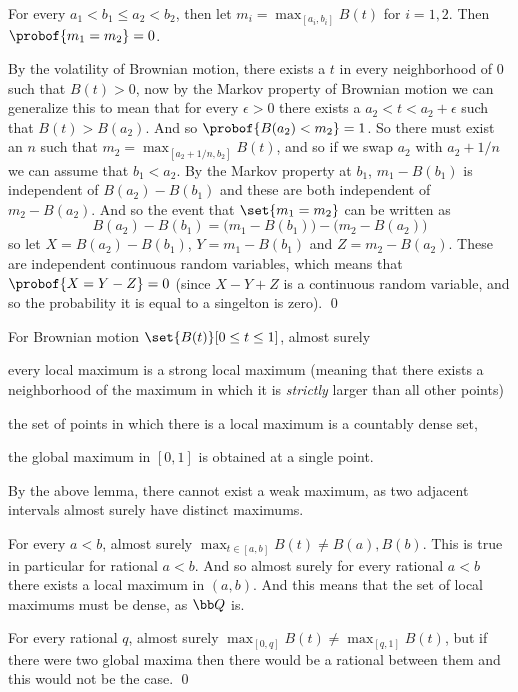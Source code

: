 \blemm

    For every $a_1<b_1\leq a_2<b_2$, then let $m_i=\max_{[a_i,b_i]}B(t)$ for $i=1,2$.
    Then $\probof{m_1=m_2}=0$.

\elemm

By the volatility of Brownian motion, there exists a $t$ in every neighborhood of $0$ such that $B(t)>0$, now by the Markov property of Brownian motion we can generalize this to mean that for every
$\epsilon>0$ there exists a $a_2<t<a_2+\epsilon$ such that $B(t)>B(a_2)$.
And so $\probof{B(a_2)<m_2}=1$.
So there must exist an $n$ such that $m_2=\max_{[a_2+1/n,b_2]}B(t)$, and so if we swap $a_2$ with $a_2+1/n$ we can assume that $b_1<a_2$.
By the Markov property at $b_1$, $m_1-B(b_1)$ is independent of $B(a_2)-B(b_1)$ and these are both independent of $m_2-B(a_2)$.
And so the event that $\set{m_1=m_2}$ can be written as
$$ B(a_2) - B(b_1) = \bigl(m_1 - B(b_1)\bigr) - \bigl(m_2-B(a_2)\bigr) $$
so let $X=B(a_2)-B(b_1)$, $Y=m_1-B(b_1)$ and $Z=m_2-B(a_2)$.
These are independent continuous random variables, which means that $\probof{X=Y-Z}=0$ (since $X-Y+Z$ is a continuous random variable, and so the probability it is equal to a singelton is zero).
\qed

\bthrm

    For Brownian motion $\set{B(t)}[0\leq t\leq1]$, almost surely
    \benum
        \item every local maximum is a strong local maximum (meaning that there exists a neighborhood of the maximum in which it is {\it strictly} larger than all other points)
        \item the set of points in which there is a local maximum is a countably dense set,
        \item the global maximum in $[0,1]$ is obtained at a single point.
    \eenum

\ethrm

\benum
    \item By the above lemma, there cannot exist a weak maximum, as two adjacent intervals almost surely have distinct maximums.
    \item For every $a<b$, almost surely $\max_{t\in[a,b]}B(t)\neq B(a),B(b)$.
        This is true in particular for rational $a<b$.
        And so almost surely for every rational $a<b$ there exists a local maximum in $(a,b)$.
        And this means that the set of local maximums must be dense, as ${\bb Q}$ is.
    \item For every rational $q$, almost surely $\max_{[0,q]}B(t)\neq\max_{[q,1]}B(t)$, but if there were two global maxima then there would be a rational between them and this would not be the case.
        \qed
\eenum

